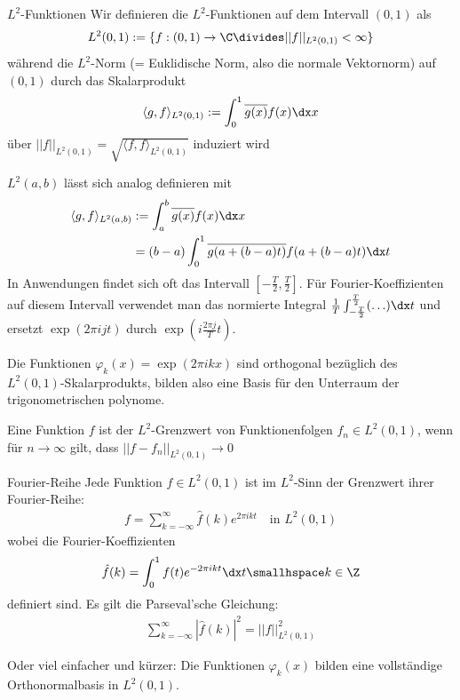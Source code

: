 \begin{definition}[]{$L^2$-Funktionen}
    Wir definieren die $L^2$-Funktionen auf dem Intervall $(0, 1)$ als
    \rmvspace
    \begin{align*}
        L^2(0, 1) := \{ f: (0, 1) \rightarrow \C \divides ||f||_{L^2(0, 1)} < \infty \}
    \end{align*}
    während die $L^2$-Norm (= Euklidische Norm, also die normale Vektornorm) auf $(0, 1)$ durch das Skalarprodukt
    \rmvspace
    \begin{align*}
        \langle g, f \rangle_{L^2(0, 1)} := \int_{0}^{1} \overline{g(x)} f(x) \dx x
    \end{align*}
    über $||f||_{L^2(0, 1)} = \sqrt{\langle f, f \rangle_{L^2(0, 1)}}$ induziert wird
\end{definition}

\inlineremark $L^2(a, b)$ lässt sich analog definieren mit
\rmvspace
\begin{align*}
    \langle g, f \rangle_{L^2(a, b)} & := \int_{a}^{b} \overline{g(x)} f(x) \dx x                              \\
                                     & = (b - a) \int_{0}^{1} \overline{g(a + (b - a)t)} f(a + (b - a)t) \dx t
\end{align*}
In Anwendungen findet sich oft das Intervall $\left[ -\frac{T}{2}, \frac{T}{2} \right]$.
Für Fourier-Koeffizienten auf diesem Intervall verwendet man das normierte Integral $\frac{1}{T} \int_{-\frac{T}{2}}^{\frac{T}{2}} (\ldots) \dx t$ und ersetzt $\exp(2\pi ijt)$ durch $\exp(i \frac{2\pi j}{T} t)$.

\inlineremark Die Funktionen $\varphi_k(x) = \exp(2\pi ikx)$ sind orthogonal bezüglich des $L^2(0, 1)$-Skalarprodukts, bilden also eine Basis für den Unterraum der trigonometrischen polynome.


\inlinedef Eine Funktion $f$ ist der $L^2$-Grenzwert von Funktionenfolgen $f_n \in L^2(0, 1)$, wenn für $n \rightarrow \infty$ gilt, dass $||f - f_n||_{L^2(0, 1)} \rightarrow 0$


\newpage
\begin{theorem}[]{Fourier-Reihe}
    Jede Funktion $f \in L^2(0, 1)$ ist im $L^2$-Sinn der Grenzwert ihrer Fourier-Reihe:
    \rmvspace
    \begin{align*}
        f = \sum_{k = -\infty}^{\infty} \hat{f}(k) e^{2\pi ikt}\quad\text{in }L^2(0,1)
    \end{align*}
    wobei die Fourier-Koeffizienten
    \rmvspace
    \begin{align*}
        \hat{f}(k) = \int_{0}^{1} f(t)e^{-2\pi ikt} \dx t \smallhspace k \in \Z
    \end{align*}
    definiert sind. Es gilt die Parseval'sche Gleichung:
    \rmvspace
    \begin{align*}
        \sum_{k = -\infty}^{\infty} |\hat{f}(k)|^2 = ||f||_{L^2(0, 1)}^2
    \end{align*}
\end{theorem}
\inlineremark Oder viel einfacher und kürzer: Die Funktionen $\varphi_k(x)$ bilden eine vollständige Orthonormalbasis in $L^2(0, 1)$.

